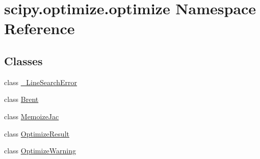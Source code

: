 \hypertarget{namespacescipy_1_1optimize_1_1optimize}{}\section{scipy.\+optimize.\+optimize Namespace Reference}
\label{namespacescipy_1_1optimize_1_1optimize}
\subsection*{Classes}
\begin{DoxyCompactItemize}
\item 
class \hyperlink{classscipy_1_1optimize_1_1optimize_1_1__LineSearchError}{\+\_\+\+Line\+Search\+Error}
\item 
class \hyperlink{classscipy_1_1optimize_1_1optimize_1_1Brent}{Brent}
\item 
class \hyperlink{classscipy_1_1optimize_1_1optimize_1_1MemoizeJac}{Memoize\+Jac}
\item 
class \hyperlink{classscipy_1_1optimize_1_1optimize_1_1OptimizeResult}{Optimize\+Result}
\item 
class \hyperlink{classscipy_1_1optimize_1_1optimize_1_1OptimizeWarning}{Optimize\+Warning}
\end{DoxyCompactItemize}
